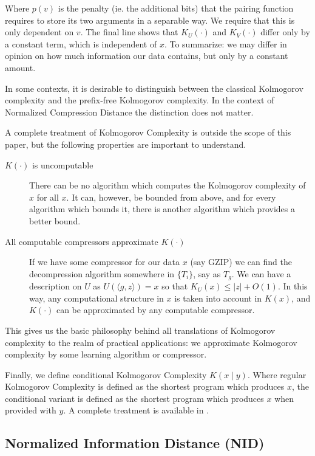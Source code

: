 \documentclass{article}
\begin{document}
Where $p(v)$ is the penalty (ie. the additional bits) that the pairing function requires to store its two arguments in a separable way. We require that this is only dependent on $v$. The final line shows that $K_U(\cdot)$ and $K_V(\cdot)$ differ only by a constant term, which is independent of $x$. To summarize: we may differ in opinion on how much information our data contains, but only by a constant amount.
  
In some contexts, it is desirable to distinguish between the classical Kolmogorov complexity and the prefix-free Kolmogorov complexity. In the context of Normalized Compression Distance the distinction does not matter.

A complete treatment of Kolmogorov Complexity is outside the scope of this paper, but the following properties are important to understand.

\begin{description}
\item[$K(\cdot)$ is uncomputable] There can be no algorithm which computes the Kolmogorov complexity of $x$ for all $x$. It can, however, be bounded from above, and for every algorithm which bounds it, there is another algorithm which provides a better bound. 
\item[All computable compressors approximate $K(\cdot)$] If we have some compressor for our data $x$ (say GZIP) we can find the decompression algorithm somewhere in $\{T_i\}$, say as $T_g$. We can have a description on $U$ as $U(\langle g, z\rangle) = x$ so that $K_U(x)\leq |z| + O(1)$. In this way, any computational structure in $x$ is taken into account in $K(x)$, and $K(\cdot)$ can be approximated by any computable compressor.
\end{description}

This gives us the basic philosophy behind all translations of Kolmogorov complexity to the realm of practical applications: we approximate Kolmogorov complexity by some learning algorithm or compressor. 

Finally, we define conditional Kolmogorov Complexity $K(x \mid y)$. Where regular Kolmogorov Complexity is defined as the shortest program which produces $x$, the conditional variant is defined as the shortest program which produces $x$ when provided with $y$. A complete treatment is available in \cite{li1997introduction}.

\subsection*{Normalized Information Distance (NID)}
\end{document}

